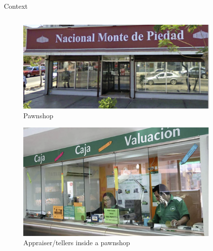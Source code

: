 \documentclass[8pt]{beamer}
\begin{document}
\begin{frame}{Context}
\begin{columns}
\begin{column}{.45\textwidth}

\begin{figure}[H]
    \begin{center}
    \caption{Pawnshop}
        \includegraphics[width=0.95\textwidth]{Figuras/empenio2.png}
    \end{center}
    \end{figure}
\begin{figure}[H]
    \begin{center}
    \caption{Appraiser/tellers inside a pawnshop}
        \includegraphics[width=0.95\textwidth]{Figuras/empenio9.png}
    \end{center}
    \end{figure}    
    
    \end{column}
    
\begin{column}{.45\textwidth}


\end{column}
\end{columns}
\end{frame}
\end{document}
